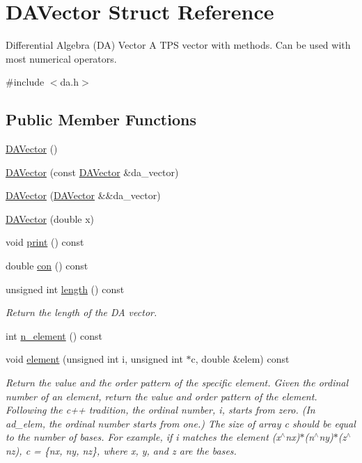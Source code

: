 \hypertarget{struct_d_a_vector}{}\section{D\+A\+Vector Struct Reference}
\label{struct_d_a_vector}


Differential Algebra (DA) Vector A T\+PS vector with methods. Can be used with most numerical operators.  




{\ttfamily \#include $<$da.\+h$>$}

\subsection*{Public Member Functions}
\begin{DoxyCompactItemize}
\item 
\mbox{\hyperlink{struct_d_a_vector_a47a3dafd63402c989e1a85ce9ef93039}{D\+A\+Vector}} ()
\item 
\mbox{\hyperlink{struct_d_a_vector_a99e3cd385c2a8ba85a55283446eb47f0}{D\+A\+Vector}} (const \mbox{\hyperlink{struct_d_a_vector}{D\+A\+Vector}} \&da\+\_\+vector)
\item 
\mbox{\hyperlink{struct_d_a_vector_aabf1ec2c14ca01aad172c4c85337803c}{D\+A\+Vector}} (\mbox{\hyperlink{struct_d_a_vector}{D\+A\+Vector}} \&\&da\+\_\+vector)
\item 
\mbox{\hyperlink{struct_d_a_vector_a8cc9ed440ecd6c68b644f266f4aabd15}{D\+A\+Vector}} (double x)
\item 
void \mbox{\hyperlink{struct_d_a_vector_a6d5253e4312ca9ca5e68859f706f9f2c}{print}} () const
\item 
double \mbox{\hyperlink{struct_d_a_vector_a00ef34ddb1dce8bead6d43a24b3fb23e}{con}} () const
\item 
unsigned int \mbox{\hyperlink{struct_d_a_vector_a295d0ae4da5ab95ae2a367365d521f64}{length}} () const
\begin{DoxyCompactList}\small\item\em Return the length of the DA vector. \end{DoxyCompactList}\item 
int \mbox{\hyperlink{struct_d_a_vector_acc7180677f26baf2a1ac32efad7a2bf5}{n\+\_\+element}} () const
\item 
void \mbox{\hyperlink{struct_d_a_vector_a8746be0ebf79a6f1306f134f2c732606}{element}} (unsigned int i, unsigned int $\ast$c, double \&elem) const
\begin{DoxyCompactList}\small\item\em Return the value and the order pattern of the specific element. Given the ordinal number of an element, return the value and order pattern of the element. Following the c++ tradition, the ordinal number, i, starts from zero. (In ad\+\_\+elem, the ordinal number starts from one.) The size of array c should be equal to the number of bases. For example, if i matches the element (x$^\wedge$nx)$\ast$(n$^\wedge$ny)$\ast$(z$^\wedge$nz), c = \{nx, ny, nz\}, where x, y, and z are the bases. \end{DoxyCompactList}\item 

\end{DoxyCompactItemize}
